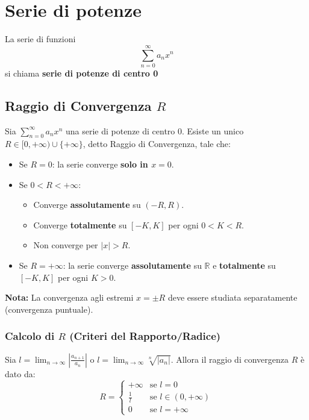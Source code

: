 \documentclass[10pt, a4paper]{article}
\begin{document}
\section{Serie di potenze}
    La serie di funzioni
    \begin{equation*}
        \sum_{n=0}^{\infty}a_n x^n
    \end{equation*}            
    si chiama \textbf{serie di potenze di centro 0}
    \subsection{Raggio di Convergenza $R$}
        Sia $\sum_{n=0}^{\infty}a_n x^n$ una serie di potenze di centro 0. Esiste un unico $R \in [0,+\infty) \cup \{+\infty\}$, detto Raggio di Convergenza, tale che:
        \begin{itemize}
            \item Se $R=0$: la serie converge \textbf{solo in $x=0$}.
            \item Se $0<R<+\infty$:
            \begin{itemize}
                \item Converge \textbf{assolutamente} su $(-R, R)$.
                \item Converge \textbf{totalmente} su $[-K,K]$ per ogni $0 < K < R$.
                \item Non converge per $|x|>R$.
            \end{itemize}
            \item Se $R=+\infty$: la serie converge \textbf{assolutamente} su $\mathbb{R}$ e \textbf{totalmente} su $[-K,K]$ per ogni $K > 0$.
        \end{itemize}
        \textbf{Nota:} La convergenza agli estremi $x = \pm R$ deve essere studiata separatamente (convergenza puntuale).
    \subsubsection{Calcolo di $R$ (Criteri del Rapporto/Radice)}
        Sia $l = \lim_{n\to\infty} \left|\frac{a_{n+1}}{a_n}\right|$ o $l = \lim_{n\to\infty} \sqrt[n]{|a_n|}$.
        Allora il raggio di convergenza $R$ è dato da:
        \begin{equation*}
            R=\begin{cases}
                +\infty & \text{se } l = 0\\
                \frac{1}{l} & \text{se } l \in (0,+\infty)\\
                0 & \text{se } l = +\infty
            \end{cases}
        \end{equation*}
\end{document}
